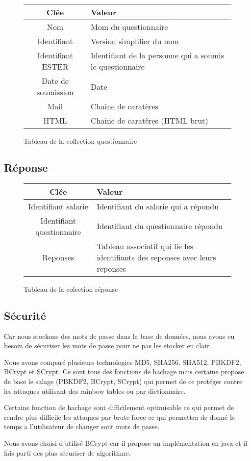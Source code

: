 \begin{figure}[H]
    \begin{center}
        \begin{tabularx}{17cm}{|c|X|}
            \hline
            Clée & Valeur  \tabularnewline 
            \hline
            Nom & 
            Mom du questionnaire \tabularnewline 
            Identifiant & 
            Version simplifier du nom \tabularnewline
            Identifiant ESTER & 
            Identifiant de la personne qui a soumis le questionnaire \tabularnewline
            Date de soumission & 
            Date \tabularnewline
            Mail & 
            Chaine de caratères \tabularnewline
            HTML & 
            Chaine de caratères (HTML brut) \tabularnewline
            \hline
        \end{tabularx}
    \end{center}
    \caption{Tableau de la collection questionnaire}
\end{figure}

\subsection{Réponse}

\begin{figure}[H]
    \begin{center}
        \begin{tabularx}{17cm}{|c|X|}
            \hline
            Clée & Valeur  \tabularnewline 
            \hline
            Identifiant salarie & 
            Identifiant du salarie qui a répondu \tabularnewline
            Identifiant questionnaire & 
            Identifiant du questionnaire répondu \tabularnewline
            Reponses & 
            Tableau associatif qui lie les identifiants des reponses 
            avec leurs reponses \tabularnewline
            \hline
        \end{tabularx}
    \end{center}
    \caption{Tableau de la colection réponse}
\end{figure}

\subsection{Sécurité}

Car nous stockons des mots de passe dans la base de données, nous avons eu besoin de sécuriser les mots de passe pour ne pas les stocker en clair.

Nous avons comparé plusieurs technologies MD5, SHA256, SHA512, PBKDF2, BCrypt et SCrypt. Ce sont tous des fonctions de hachage mais certaine propose de base le salage (PBKDF2, BCrypt, SCrypt) qui permet de ce protéger contre les attaques utilisant des rainbow tables ou par dictionnaire. 

Certaine fonction de hachage sont difficilement optimisable ce qui permet de rendre plus difficile les attaques par brute force ce qui permettra de donné le temps a l'utilisateur de changer sont mots de passe.     

Nous avons choisi d'utilisé BCrypt car il propose un implémentation en java et il fais parti des plus sécuriser de algorithme.
